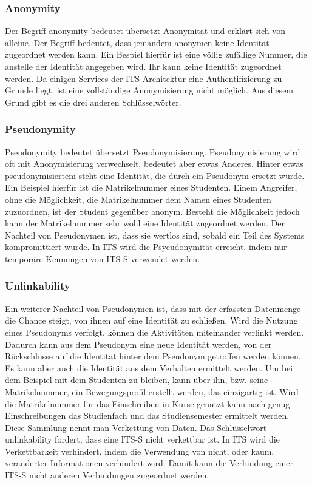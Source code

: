 \subsubsection{Anonymity}
Der Begriff anonymity bedeutet übersetzt Anonymität und erklärt sich von alleine. Der Begriff bedeutet, dass jemandem anonymen keine Identität zugeordnet werden kann. Ein Bespiel hierfür ist eine völlig zufällige Nummer, die anstelle der Identität angegeben wird. Ihr kann keine Identität zugeordnet werden. Da einigen Services der \ac{ITS} Architektur eine Authentifizierung zu Grunde liegt, ist eine vollständige Anonymisierung nicht möglich. Aus diesem Grund gibt es die drei anderen Schlüsselwörter.

\subsubsection{Pseudonymity}
Pseudonymity bedeutet übersetzt Pseudonymisierung.  Pseudonymisierung wird oft mit Anonymisierung verwechselt, bedeutet aber etwas Anderes. Hinter etwas pseudonymisiertem steht eine Identität, die durch ein Pseudonym ersetzt wurde. Ein Beispiel hierfür ist die Matrikelnummer eines Studenten. Einem Angreifer, ohne die Möglichkeit, die Matrikelnummer dem Namen eines Studenten zuzuordnen, ist der Student gegenüber anonym. Besteht die Möglichkeit jedoch kann der Matrikelnummer sehr wohl eine Identität zugeordnet werden. Der Nachteil von Pseudonymen ist, dass sie wertlos sind, sobald ein Teil des Systems kompromittiert wurde. In \ac{ITS} wird die  Psyeudonymität erreicht, indem nur temporäre Kennungen von \ac{ITS-S} verwendet werden.


\subsubsection{Unlinkability}
Ein weiterer Nachteil von Pseudonymen ist, dass mit der erfassten Datenmenge die Chance steigt, von ihnen auf eine Identität zu schließen. Wird die Nutzung eines Pseudonyms verfolgt, können die Aktivitäten miteinander verlinkt werden. Dadurch kann aus dem Pseudonym eine neue Identität werden, von der Rückschlüsse auf die Identität hinter dem Pseudonym getroffen werden können. Es kann aber auch die Identität aus dem Verhalten ermittelt werden. Um bei dem Beispiel mit dem Studenten zu bleiben, kann über ihn, bzw. seine Matrikelnummer, ein Bewegungsprofil erstellt werden, das  einzigartig ist. Wird die Matrikelnummer für das Einschreiben in Kurse genutzt kann nach genug Einschreibungen das Studienfach und das Studiensemester ermittelt werden. Diese Sammlung nennt man Verkettung von Daten. Das Schlüsselwort unlinkability fordert, dass eine \ac{ITS-S} nicht verkettbar ist. In \ac{ITS} wird die Verkettbarkeit verhindert, indem die Verwendung von nicht, oder kaum, veränderter Informationen verhindert wird. Damit kann die Verbindung einer \ac{ITS-S} nicht anderen Verbindungen zugeordnet werden.

